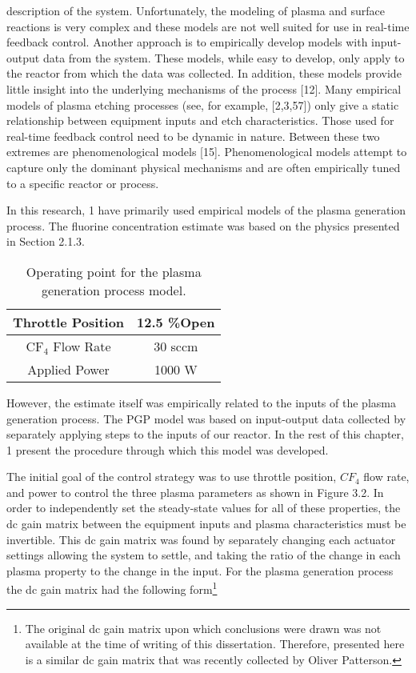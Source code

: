 \noindent description of the system. Unfortunately, the modeling of plasma and surface reactions is very complex and these models are not well suited for use in real-time feedback control. Another approach is to empirically develop models with input-output data from the system. These models, while easy to develop, only apply to the reactor from which the data was collected. In addition, these models provide little insight into the underlying mechanisms of the process [12]. Many empirical models of plasma etching processes (see, for example, [2,3,57]) only give a static relationship between equipment inputs and etch characteristics. Those used for real-time feedback control need to be dynamic in nature. Between these two extremes are phenomenological models [15]. Phenomenological models attempt to capture only the dominant physical mechanisms and are often empirically tuned to a specific reactor or process.


In this research, 1 have primarily used empirical models of the plasma generation process. The fluorine concentration estimate was based on the physics presented in Section 2.1.3.

\begin{table}[H]
	\centering
	\begin{tabular}{|c|c|}
		\hline
		Throttle Position & 12.5 \%Open \\
		\hline
		$\text{CF}_{4}$ Flow Rate & 30 sccm \\
		\hline
		Applied Power & 1000 W \\
		\hline
	\end{tabular}
	\bf\caption{ Operating point for the plasma generation process model.}
	\label{Table:3.1}
\end{table}

However, the estimate itself was empirically related to the inputs of the plasma generation process. The PGP model was based on input-output data collected by separately applying steps to the inputs of our reactor. In the rest of this chapter, 1 present the procedure through which this model was developed.

The initial goal of the control strategy was to use throttle position, $CF_{4}$ flow rate, and power to control the three plasma parameters as shown in Figure 3.2. In order to independently set the steady-state values for all of these properties, the dc gain matrix between the equipment inputs and plasma characteristics must be invertible. This dc gain matrix was found by separately changing each actuator settings allowing the system to settle, and taking the ratio of the change in each plasma property to the change in the input. For the plasma generation process the dc gain matrix had the following form\footnote{The original dc gain matrix upon which conclusions were drawn was not available at the time of writing	of this dissertation. Therefore, presented here is a similar dc gain matrix that was recently collected by Oliver Patterson.}

